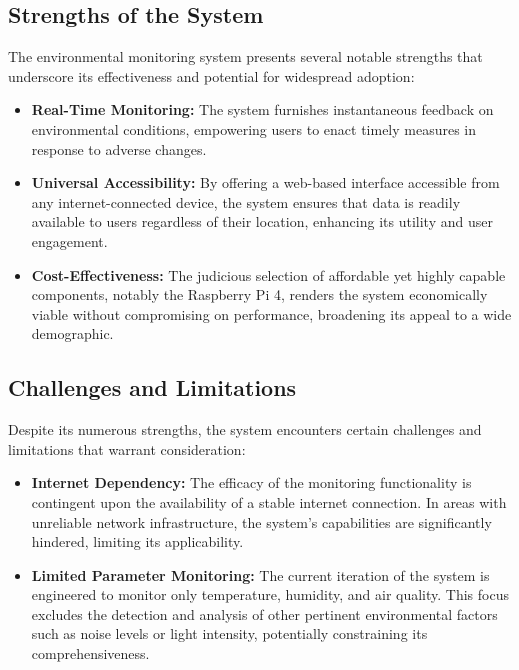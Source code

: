 \documentclass[a4paper, 12pt]{report}
\begin{document}
\subsection{Strengths of the System}
The environmental monitoring system presents several notable strengths that underscore its effectiveness and potential for widespread adoption:
\begin{itemize}
    \item \textbf{Real-Time Monitoring:} The system furnishes instantaneous feedback on environmental conditions, empowering users to enact timely measures in response to adverse changes.
    \item \textbf{Universal Accessibility:} By offering a web-based interface accessible from any internet-connected device, the system ensures that data is readily available to users regardless of their location, enhancing its utility and user engagement.
    \item \textbf{Cost-Effectiveness:} The judicious selection of affordable yet highly capable components, notably the Raspberry Pi 4, renders the system economically viable without compromising on performance, broadening its appeal to a wide demographic.
\end{itemize}

\subsection{Challenges and Limitations}
Despite its numerous strengths, the system encounters certain challenges and limitations that warrant consideration:
\begin{itemize}
    \item \textbf{Internet Dependency:} The efficacy of the monitoring functionality is contingent upon the availability of a stable internet connection. In areas with unreliable network infrastructure, the system's capabilities are significantly hindered, limiting its applicability.
    \item \textbf{Limited Parameter Monitoring:} The current iteration of the system is engineered to monitor only temperature, humidity, and air quality. This focus excludes the detection and analysis of other pertinent environmental factors such as noise levels or light intensity, potentially constraining its comprehensiveness.
\end{itemize}
\end{document}
